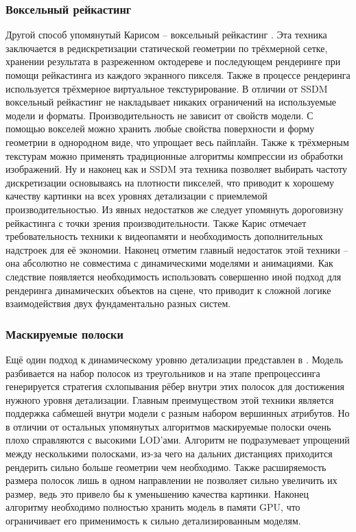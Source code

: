 \documentclass[12pt]{extarticle}
\begin{document}
\subsubsection{Воксельный рейкастинг}
Другой способ упомянутый Карисом -- воксельный рейкастинг \cite{cur_and_next_parallelism}. Эта техника заключается в редискретизации статической геометрии по трёхмерной сетке, хранении результата в разреженном октодереве и последующем рендеринге при помощи рейкастинга из каждого экранного пикселя. Также в процессе рендеринга используется трёхмерное виртуальное текстурирование. В отличии от SSDM воксельный рейкастинг не накладывает никаких ограничений на используемые модели и форматы. Производительность не зависит от свойств модели. С помощью вокселей можно хранить любые свойства поверхности и форму геометрии в однородном виде, что упрощает весь пайплайн. Также к трёхмерным текстурам можно применять традиционные алгоритмы компрессии из обработки изображений. Ну и наконец как и SSDM эта техника позволяет выбирать частоту дискретизации основываясь на плотности пикселей, что приводит к хорошему качеству картинки на всех уровнях детализации с приемлемой производительностью. Из явных недостатков же следует упомянуть дороговизну рейкастинга с точки зрения производительности. Также Карис отмечает требовательность техники к видеопамяти и необходимость дополнительных надстроек для её экономии. Наконец отметим главный недостаток этой техники -- она абсолютно не совместима с динамическими моделями и анимациями. Как следствие появляется необходимость использовать совершенно иной подход для рендеринга динамических объектов на сцене, что приводит к сложной логике взаимодействия двух фундаментально разных систем.

\subsubsection{Маскируемые полоски}
Ещё один подход к динамическому уровню детализации представлен в \cite{RIPOLLES2009184}. Модель разбивается на набор полосок из треугольников и на этапе препроцессинга генерируется стратегия схлопывания рёбер внутри этих полосок для достижения нужного уровня детализации. Главным преимуществом этой техники является поддержка сабмешей внутри модели с разным набором вершинных атрибутов. Но в отличии от остальных упомянутых алгоритмов маскируемые полоски очень плохо справляются с высокими LOD'ами. Алгоритм не подразумевает упрощений между несколькими полосками, из-за чего на дальних дистанциях приходится рендерить сильно больше геометрии чем необходимо. Также расширяемость размера полосок лишь в одном направлении не позволяет сильно увеличить их размер, ведь это привело бы к уменьшению качества картинки. Наконец алгоритму необходимо полностью хранить модель в памяти GPU, что ограничивает его применимость к сильно детализированным моделям.
\end{document}
